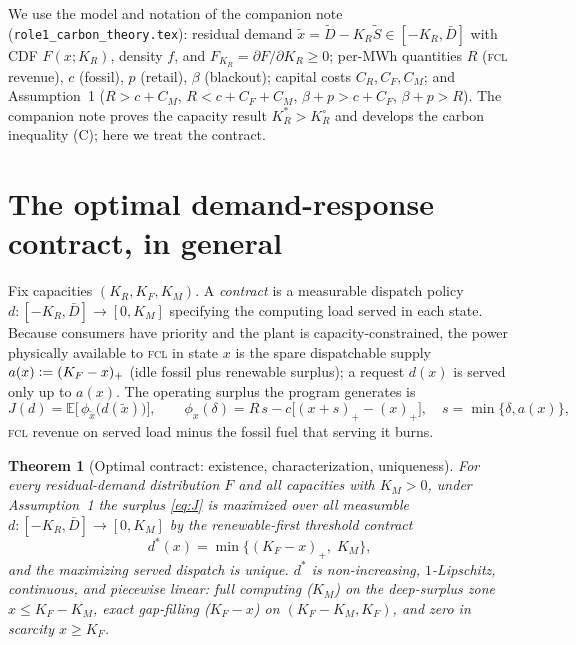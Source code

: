 \documentclass[11pt,reqno]{amsart}
\theoremstyle{plain}
\newtheorem{theorem}{Theorem}
\theoremstyle{definition}
\theoremstyle{remark}
\newcommand{\KR}{K_R}\newcommand{\KF}{K_F}\newcommand{\KM}{K_M}
\newcommand{\KRs}{K_R^{*}}\newcommand{\KFs}{K_F^{*}}\newcommand{\KMs}{K_M^{*}}
\newcommand{\KRo}{K_R^{\circ}}\newcommand{\KFo}{K_F^{\circ}}
\newcommand{\Dbar}{\bar D}
\newcommand{\CM}{C_M}\newcommand{\CF}{C_F}\newcommand{\CR}{C_R}
\newcommand{\bp}{\beta+p}
\newcommand{\FKR}{F_{\!\KR}}
\newcommand{\E}{\mathbb{E}}\newcommand{\PP}{\mathbb{P}}
\newcommand{\eqdef}{\vcentcolon=}
\newcommand{\dstar}{d^{*}}
\begin{document}
We use the model and notation of the companion note
(\texttt{role1\_carbon\_theory.tex}): residual demand
$\tilde x=\tilde D-\KR\tilde S\in[-\KR,\Dbar]$ with CDF $F(x;\KR)$, density
$f$, and $\FKR=\partial F/\partial\KR\ge0$; per-MWh quantities $R$ (\textsc{fcl}
revenue), $c$ (fossil), $p$ (retail), $\beta$ (blackout); capital costs
$\CR,\CF,\CM$; and Assumption~1 ($R>c+\CM$, $R<c+\CF+\CM$, $\bp>c+\CF$,
$\bp>R$). The companion note proves the capacity result $\KRs>\KRo$ and develops
the carbon inequality (C); here we treat the contract.

\section{The optimal demand-response contract, in general}\label{sec:contract}

Fix capacities $(\KR,\KF,\KM)$. A \emph{contract} is a measurable dispatch policy
$d:[-\KR,\Dbar]\to[0,\KM]$ specifying the computing load served in each state.
Because consumers have priority and the plant is capacity-constrained, the power
physically available to \textsc{fcl} in state $x$ is the spare dispatchable
supply $a(x)\eqdef(\KF-x)_+$ (idle fossil plus renewable surplus); a request
$d(x)$ is served only up to $a(x)$. The operating surplus the program generates is
\begin{equation}\label{eq:J}
  J(d)=\E\big[\,\phi_{\tilde x}\big(d(\tilde x)\big)\big],
  \qquad
  \phi_x(\delta)=R\,s - c\big[(x+s)_+-(x)_+\big],\quad s=\min\{\delta,a(x)\},
\end{equation}
\textsc{fcl} revenue on served load minus the fossil fuel that serving it burns.

\begin{theorem}[Optimal contract: existence, characterization, uniqueness]\label{thm:contract}
For every residual-demand distribution $F$ and all capacities with $\KM>0$, under
Assumption~1 the surplus \eqref{eq:J} is maximized over all measurable
$d:[-\KR,\Dbar]\to[0,\KM]$ by the \emph{renewable-first threshold contract}
\begin{equation}\label{eq:dstar}
  \dstar(x)=\min\{(\KF-x)_+,\;\KM\},
\end{equation}
and the maximizing served dispatch is unique. $\dstar$ is non-increasing,
$1$-Lipschitz, continuous, and piecewise linear: full computing
($\KM$) on the deep-surplus zone $x\le\KF-\KM$, exact gap-filling ($\KF-x$) on
$(\KF-\KM,\KF)$, and zero in scarcity $x\ge\KF$.
\end{theorem}
\end{document}
